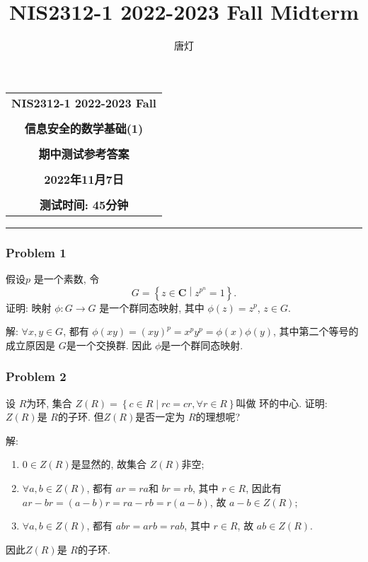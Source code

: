 \documentclass[a4paper,12pt]{ctexart}
\title{NIS2312-1 2022-2023 Fall Midterm}
\author{唐灯}
\newcommand{\Com}{\mathbf{C}}
\begin{document}
  \begin{center}

  \vspace{-0.3in}
  \begin{tabular}{c}
    \textbf{\Large NIS2312-1 2022-2023 Fall} \\
    \textbf{\Large  } \\
    \textbf{\Large  信息安全的数学基础(1)} \\
    \textbf{\Large  } \\
    \textbf{\Large  期中测试参考答案} \\
    \textbf{\Large  } \\
    \textbf{\Large  2022年11月7日} \\
    \textbf{\Large  } \\
    \textbf{\Large  测试时间: 45分钟} \\
  \end{tabular}
  \end{center}
  \noindent
  \rule{\linewidth}{0.4pt}
  

\subsubsection*{Problem 1}
    假设$ p $ 是一个素数, 令
    \[G = \left\{z\in\Com\middle|z^{p^n}=1\right\}.\]
    证明: 映射 $ \phi:G\rightarrow G $ 是一个群同态映射, 其中 $ \phi(z)=z^p $, $ z\in G $.
      
    解: $ \forall x,y\in G $, 都有 $ \phi(xy)=(xy)^p=x^py^p=\phi(x)\phi(y) $, 
    其中第二个等号的成立原因是 $ G $是一个交换群. 因此 $ \phi $是一个群同态映射.
    \subsubsection*{Problem 2}
    设 $ R $为环, 集合 $ Z(R)=\left\{c\in R\middle|rc=cr,\forall r\in R\right\} $叫做
    环的中心. 证明: $ Z(R) $是 $ R $的子环. 但$ Z(R) $是否一定为 $ R $的理想呢?   

    解: 
    \begin{enumerate}[label=\roman{*})]
      \item $ 0\in Z(R) $是显然的, 故集合 $ Z(R) $非空;
      \item $ \forall a,b\in Z(R) $, 都有 $ ar=ra $和 $ br=rb $, 其中 $ r\in R $, 因此有
      $ ar-br=(a-b)r=ra-rb=r(a-b) $, 故 $ a-b\in Z(R) $;
      \item $ \forall a,b\in Z(R) $, 都有 $ abr=arb=rab $, 其中 $ r\in R $, 故 $ ab\in Z(R) $.
    \end{enumerate}
    因此$ Z(R) $是 $ R $的子环. 
    
\end{document}
